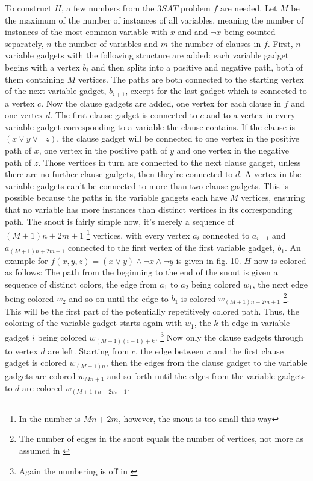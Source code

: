 \documentclass[12pt,a4paper]{article}
\begin{document}
To construct $H$, a few numbers from the $3SAT$ problem $f$ are needed. Let $M$ be the maximum of the  number of instances of all variables, meaning the number of instances of the most common variable with $x$ and and $\neg x$ being counted separately, $n$ the number of variables and $m$ the number of clauses in $f$. First, $n$ variable gadgets with the following structure are added: each variable gadget begins with a vertex $b_i$ and then splits into a positive and negative path, both of them containing $M$ vertices. The paths are both connected to the starting vertex of the next variable gadget, $b_{i+1}$, except for the last gadget which is connected to a vertex $c$. Now the clause gadgets are added, one vertex for each clause in $f$ and one vertex $d$. The first clause gadget is connected to $c$ and to a vertex in every variable gadget corresponding to a variable the clause contains. If the clause is $(x \vee y \vee \neg z)$, the clause gadget will be connected to one vertex in the positive path of $x$, one vertex in the positive path of $y$ and one vertex in the negative path of $z$. Those vertices in turn are connected to the next clause gadget, unless there are no further clause gadgets, then they're connected to $d$. A vertex in the variable gadgets can't be connected to more than two clause gadgets. This is possible because the paths in the variable gadgets each have $M$ vertices, ensuring that no variable has more instances than distinct vertices in its corresponding path. The snout is fairly simple now, it's merely a sequence of $(M+1)n+2m+1$ \footnote{In \citep{Manin2008} the number is $Mn+2m$, however, the snout is too small this way} vertices, with every vertex $a_i$ connected to $a_{i+1}$ and $a_{(M+1)n+2m+1}$ connected to the first  vertex of the first variable gadget, $b_1$. An example for $f(x, y, z) = (x \vee y) \wedge \neg x \wedge \neg y$ is given in fig. 10. 
%	
\newline	
$H$ now is colored as follows: The path from the beginning to the end of the snout is given a sequence of distinct colors, the edge from $a_1$ to $a_2$ being colored $w_1$, the next edge being colored $w_2$ and so on until the edge to $b_1$ is colored $w_{(M+1)n+2m+1}$ \footnote{The number of edges in the snout equals the number of vertices, not more as assumed in \citep{Manin2008}}. This will be the first part of the potentially repetitively colored path. Thus, the coloring of the variable gadget starts again with $w_1$, the $k$-th edge in variable gadget $i$ being colored $w_{(M+1)(i-1)+k}$. \footnote{Again the numbering is off in \citep{Manin2008}} Now only the clause gadgets through to vertex $d$ are left. Starting from $c$, the edge between $c$ and the first clause gadget is colored $w_{(M+1)n}$, then the edges from the clause gadget to the variable gadgets are colored $w_{Mn+1}$ and so forth until the edges from the variable gadgets to $d$ are colored $w_{(M+1)n+2m+1}$. 
\end{document}
